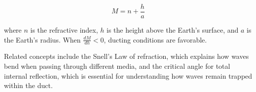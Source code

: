 \[
M = n + \frac{h}{a}
\]

where \( n \) is the refractive index, \( h \) is the height above the Earth's surface, and \( a \) is the Earth's radius. When \( \frac{dM}{dh} < 0 \), ducting conditions are favorable.

Related concepts include the Snell's Law of refraction, which explains how waves bend when passing through different media, and the critical angle for total internal reflection, which is essential for understanding how waves remain trapped within the duct.

